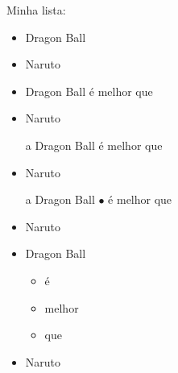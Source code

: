 \documentclass{article}
\begin{document}

Minha lista:

\begin{itemize}
	\item Dragon Ball
	\item Naruto
\end{itemize}

\begin{itemize}
  \item Dragon Ball
    \subitem é melhor que
  \item Naruto
\end{itemize}
  
\begin{itemize}
  \item[a] Dragon Ball
    \subitem é melhor que
	\item Naruto
\end{itemize}

\begin{itemize}
  \item[a] Dragon Ball
    \subitem $\bullet$ é melhor que     %
	\item Naruto
\end{itemize}

\begin{itemize}
  \item Dragon Ball
  
    \begin{itemize}
      \item é
      \item melhor
      \item que
    \end{itemize}

	\item Naruto
\end{itemize}
\end{document}
